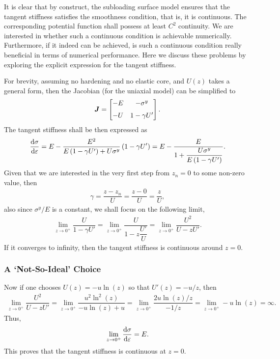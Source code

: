 It is clear that by construct, the subloading surface model ensures that the tangent stiffness satisfies the smoothness condition, that is, it is continuous. The corresponding potential function shall possess at least $C^2$ continuity.
We are interested in whether such a continuous condition is achievable numerically.
Furthermore, if it indeed can be achieved, is such a continuous condition really beneficial in terms of numerical performance.
Here we discuss these problems by exploring the explicit expression for the tangent stiffness.

For brevity, assuming no hardening and no elastic core, and $U\left(z\right)$ takes a general form, then the Jacobian (for the uniaxial model) can be simplified to
\begin{gather}
    \bm{J}=\begin{bmatrix}
        -E & -\sigma^y    \\[2mm]
        -U & 1-\gamma{}U'
    \end{bmatrix}.
\end{gather}
The tangent stiffness shall be then expressed as
\begin{gather}
    \dfrac{\mathrm{d}\sigma}{\mathrm{d}\varepsilon}=E-\dfrac{E^2}{E\left(1-\gamma{}U'\right)+U\sigma^y}\left(1-\gamma{}U'\right)=E-\dfrac{E}{1+\dfrac{U\sigma^y}{E\left(1-\gamma{}U'\right)}}.
\end{gather}
Given that we are interested in the very first step from $z_n=0$ to some non-zero value, then
\begin{gather}
    \gamma=\dfrac{z-z_n}{U}=\dfrac{z-0}{U}=\dfrac{z}{U},
\end{gather}
also since $\sigma^y/E$ is a constant, we shall focus on the following limit,
\begin{gather}
    \lim\limits_{z\to0^+}\dfrac{U}{1-\gamma{}U'}=\lim\limits_{z\to0^+}\dfrac{U}{1-z\dfrac{U'}{U}}=\lim\limits_{z\to0^+}\dfrac{U^2}{U-zU'}.
\end{gather}
If it converges to infinity, then the tangent stiffness is continuous around $z=0$.
\subsubsection{A `Not-So-Ideal' Choice}
Now if one chooses $U\left(z\right)=-u\ln\left(z\right)$ so that $U'\left(z\right)=-u/z$, then
\begin{gather}
    \lim\limits_{z\to0^+}\dfrac{U^2}{U-zU'}=\lim\limits_{z\to0^+}\dfrac{u^2\ln^2\left(z\right)}{-u\ln\left(z\right)+u}=\lim\limits_{z\to0^+}\dfrac{2u\ln\left(z\right)/z}{-1/z}=\lim\limits_{z\to0^+}-u\ln\left(z\right)=\infty.
\end{gather}
Thus,
\begin{gather}
    \lim\limits_{z\to0^+}\dfrac{\mathrm{d}\sigma}{\mathrm{d}\varepsilon}=E.
\end{gather}
This proves that the tangent stiffness is continuous at $z=0$.

